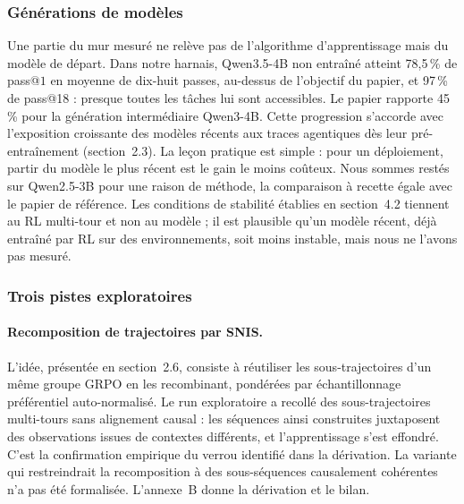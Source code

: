 \documentclass[11pt,a4paper]{article}
\begin{document}
\subsubsection{Générations de modèles}

Une partie du mur mesuré ne relève pas de l'algorithme d'apprentissage mais du modèle de départ. Dans notre harnais, Qwen3.5-4B non entraîné atteint 78{,}5\,\% de pass@$1$ en moyenne de dix-huit passes, au-dessus de l'objectif du papier, et 97\,\% de pass@18 : presque toutes les tâches lui sont accessibles. Le papier rapporte 45\,\% pour la génération intermédiaire Qwen3-4B. Cette progression s'accorde avec l'exposition croissante des modèles récents aux traces agentiques dès leur pré-entraînement (section~2.3). La leçon pratique est simple : pour un déploiement, partir du modèle le plus récent est le gain le moins coûteux. Nous sommes restés sur Qwen2.5-3B pour une raison de méthode, la comparaison à recette égale avec le papier de référence. Les conditions de stabilité établies en section~4.2 tiennent au RL multi-tour et non au modèle ; il est plausible qu'un modèle récent, déjà entraîné par RL sur des environnements, soit moins instable, mais nous ne l'avons pas mesuré.

\subsubsection{Trois pistes exploratoires}

\paragraph{Recomposition de trajectoires par SNIS.} L'idée, présentée en section~2.6, consiste à réutiliser les sous-trajectoires d'un même groupe GRPO en les recombinant, pondérées par échantillonnage préférentiel auto-normalisé. Le run exploratoire a recollé des sous-trajectoires multi-tours sans alignement causal : les séquences ainsi construites juxtaposent des observations issues de contextes différents, et l'apprentissage s'est effondré. C'est la confirmation empirique du verrou identifié dans la dérivation. La variante qui restreindrait la recomposition à des sous-séquences causalement cohérentes n'a pas été formalisée. L'annexe~B donne la dérivation et le bilan.
\end{document}
